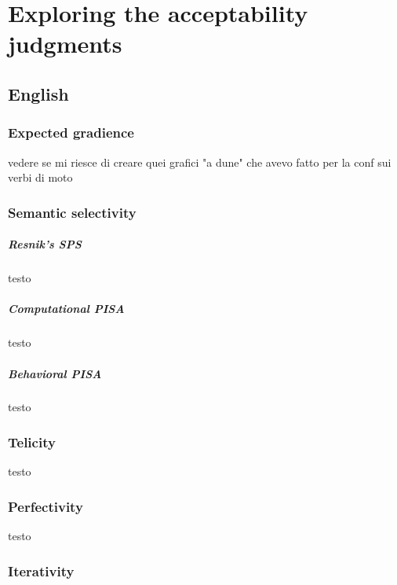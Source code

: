 \setchapterpreamble[u]{\margintoc}
\chapter{Exploring the acceptability judgments}

\section{English} 

\subsection{Expected gradience} 

vedere se mi riesce di creare quei grafici "a dune" che avevo fatto per la conf sui verbi di moto

\subsection{Semantic selectivity} 

\paragraph{Resnik's SPS} testo

\paragraph{Computational PISA} testo

\paragraph{Behavioral PISA} testo

\subsection{Telicity} 

testo

\subsection{Perfectivity} 

testo

\subsection{Iterativity}

